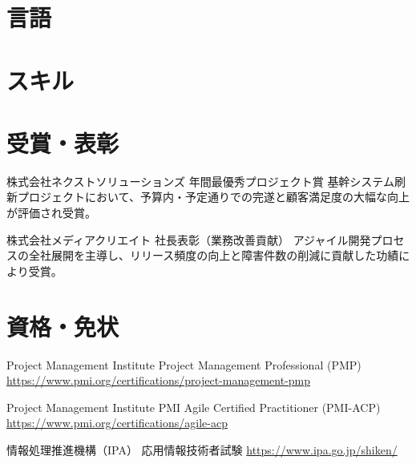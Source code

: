 \documentclass[a4paper, serif, 10pt]{moderncv}
\begin{document}
\section{言語}

\section{スキル}

\section{受賞・表彰}

        {株式会社ネクストソリューションズ}
        {年間最優秀プロジェクト賞}
        {}
        {}
        {基幹システム刷新プロジェクトにおいて、予算内・予定通りでの完遂と顧客満足度の大幅な向上が評価され受賞。}

        {株式会社メディアクリエイト}
        {社長表彰（業務改善貢献）}
        {}
        {}
        {アジャイル開発プロセスの全社展開を主導し、リリース頻度の向上と障害件数の削減に貢献した功績により受賞。}
\section{資格・免状}

        {Project Management Institute}
        {Project Management Professional (PMP)}
        {\url{https://www.pmi.org/certifications/project-management-pmp}}
        {}
        {}

        {Project Management Institute}
        {PMI Agile Certified Practitioner (PMI-ACP)}
        {\url{https://www.pmi.org/certifications/agile-acp}}
        {}
        {}

        {情報処理推進機構（IPA）}
        {応用情報技術者試験}
        {\url{https://www.ipa.go.jp/shiken/}}
        {}
        {}
\end{document}
